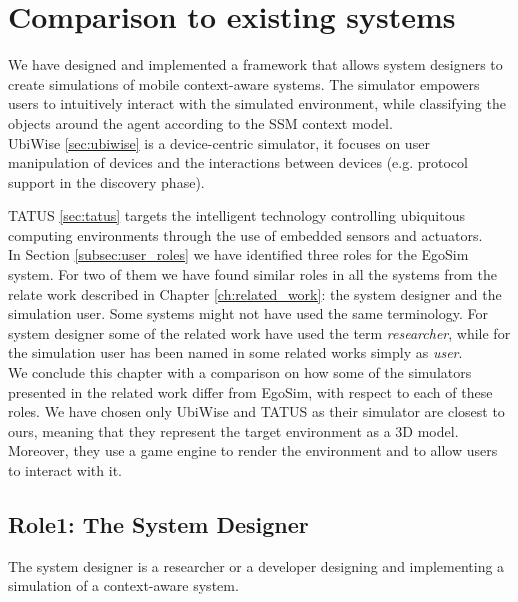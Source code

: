 \section{Comparison to existing systems} %
\label{sec:eval_comparison}
We have designed and implemented a framework that allows system designers to create simulations of mobile context-aware systems. The simulator empowers users to intuitively interact with the simulated environment, while classifying the objects around the agent according to the SSM context model.\\

UbiWise \ref{sec:ubiwise} is a device-centric simulator, it focuses on user manipulation of devices and the
interactions between devices (e.g. protocol support in the discovery phase).

TATUS \ref{sec:tatus} targets the intelligent technology controlling ubiquitous computing environments through the use of embedded sensors and actuators.\\

In Section \ref{subsec:user_roles} we have identified three roles for the EgoSim system. For two of them we have found similar roles in all the systems from the relate work described in Chapter \ref{ch:related_work}: the system designer and the simulation user. Some systems might not have used the same terminology. For system designer some of the related work have used the term \emph{researcher}, while for the simulation user has been named in some related works simply as \emph{user}.\\

We conclude this chapter with a comparison on how some of the simulators presented in the related work differ from EgoSim, with respect to each of these roles. We have chosen only UbiWise and TATUS as their simulator are closest to ours, meaning that they represent the target environment as a 3D model. Moreover, they use a game engine to render the environment and to allow users to interact with it.

\subsection{Role1: The System Designer} %
\label{subsec:eval_role_system_designer}
The system designer is a researcher or a developer designing and implementing a simulation of a context-aware system.\\

